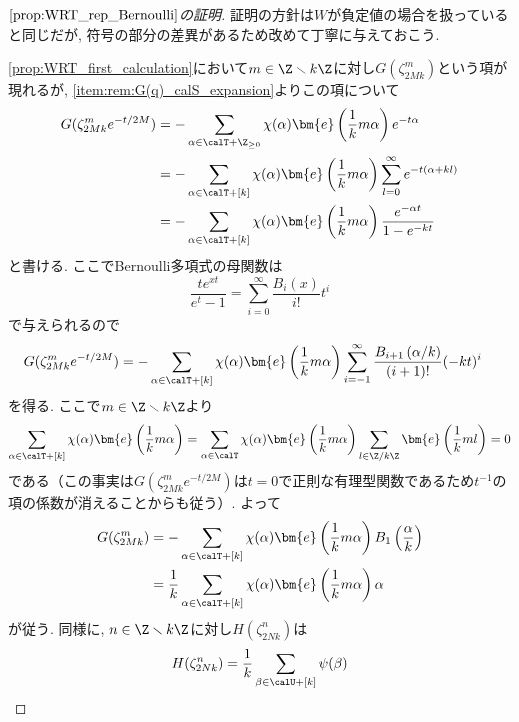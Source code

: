 \documentclass[11pt,b5paper,oneside,lualatex]{ltjsarticle} %
\numberwithin{equation}{section} %
\begin{document}
\begin{proof}[$ \cref{prop:WRT_rep_Bernoulli} $の証明]
	証明の方針は$ W $が負定値の場合を扱っている\cite[Proposition 6.5]{MM}と同じだが, 符号の部分の差異があるため改めて丁寧に与えておこう. 
	
	\cref{prop:WRT_first_calculation}において$ m \in \Z \smallsetminus k\Z $に対し$ G(\zeta_{2Mk}^{m}) $という項が現れるが, \cref{item:rem:G(q)_calS_expansion}よりこの項について
	\begin{align}
		G(\zeta_{2Mk}^{m} e^{-t/2M})
		&=
		-\sum_{\alpha \in \calT + \Z_{\ge 0}} \chi(\alpha)
		\bm{e} \left( \frac{1}{k} m \alpha \right) e^{-t\alpha}
		\\
		&=
		-\sum_{\alpha \in \calT + [k]} \chi(\alpha)
		\bm{e} \left( \frac{1}{k} m \alpha \right)
		\sum_{l=0}^{\infty} e^{-t(\alpha + kl)}
		\\
		&=
		-\sum_{\alpha \in \calT + [k]} \chi(\alpha)
		\bm{e} \left( \frac{1}{k} m \alpha \right)
		\frac{e^{-\alpha t}}{1 - e^{-kt}}
	\end{align}
	と書ける. 
	ここでBernoulli多項式の母関数は
	\[
	\frac{t e^{xt}}{e^t - 1} = \sum_{i=0}^{\infty} \frac{B_i(x)}{i!} t^i
	\]
	で与えられるので
	\begin{align}
		G(\zeta_{2Mk}^{m} e^{-t/2M})
		&=
		-\sum_{\alpha \in \calT + [k]} \chi(\alpha)
		\bm{e} \left( \frac{1}{k} m \alpha \right)
		\sum_{i = -1}^\infty \frac{B_{i+1}\left( \alpha/k \right)}{(i+1)!} (-kt)^{i}
	\end{align}
	を得る. 
	ここで$ m \in \Z \smallsetminus k\Z $より
	\[
	\sum_{\alpha \in \calT + [k]} \chi(\alpha)
	\bm{e} \left( \frac{1}{k} m \alpha \right)
	=
	\sum_{\alpha \in \calT} \chi(\alpha)
	\bm{e} \left( \frac{1}{k} m \alpha \right)
	\sum_{l \in \Z/k\Z} \bm{e} \left( \frac{1}{k} ml \right)
	= 0
	\]
	である（この事実は$ G(\zeta_{2Mk}^{m} e^{-t/2M}) $は$ t = 0 $で正則な有理型関数であるため$ t^{-1} $の項の係数が消えることからも従う）. 
	よって
	\begin{align}
		G(\zeta_{2Mk}^{m})
		&=
		-\sum_{\alpha \in \calT + [k]} \chi(\alpha)
		\bm{e} \left( \frac{1}{k} m \alpha \right)
		B_{1}\left( \frac{\alpha}{k} \right)
		\\
		&=
		\frac{1}{k}
		\sum_{\alpha \in \calT + [k]} \chi(\alpha)
		\bm{e} \left( \frac{1}{k} m \alpha \right)
		\alpha
	\end{align}
	が従う. 
	同様に, $ n \in \Z \smallsetminus k\Z $に対し$ H(\zeta_{2Nk}^{n}) $は
	\begin{align}
		H(\zeta_{2Nk}^{n})
		=
		\frac{1}{k}
		\sum_{\beta \in \calU + [k]} \psi(\beta)

\end{align}
\end{proof}
\end{document}
